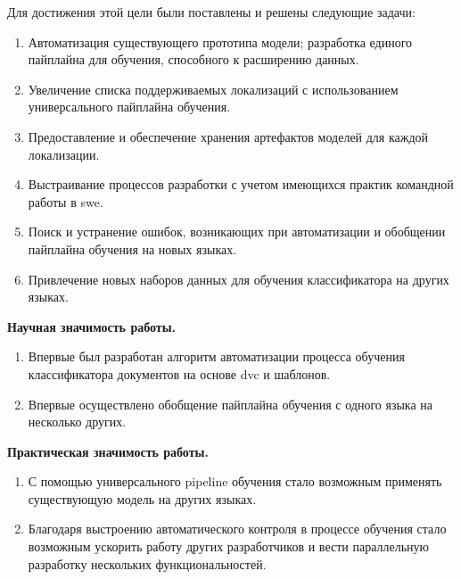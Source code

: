 Для достижения этой цели были поставлены и решены следующие задачи:
\begin{enumerate}
    \item Автоматизация существующего прототипа модели; разработка единого пайплайна для обучения, способного к расширению данных.
    \item Увеличение списка поддерживаемых локализаций с использованием универсального пайплайна обучения.
    \item Предоставление и обеспечение хранения артефактов моделей для каждой локализации.
    \item Выстраивание процессов разработки с учетом имеющихся практик командной работы в \gls{swe}.
    \item Поиск и устранение ошибок, возникающих при автоматизации и обобщении пайплайна обучения на новых языках.
    \item Привлечение новых наборов данных для обучения классификатора на других языках.
\end{enumerate}

\textbf{Научная значимость работы.}
\begin{enumerate}
    \item Впервые был разработан алгоритм автоматизации процесса обучения классификатора документов на основе \gls{dvc} и шаблонов.
    \item Впервые осуществлено обобщение пайплайна обучения с одного языка на несколько других.
\end{enumerate}

\textbf{Практическая значимость работы.}
\begin{enumerate}
    \item С помощью универсального \gls{pipeline} обучения стало возможным применять существующую модель на других языках.
    \item Благодаря выстроению автоматического контроля в процессе обучения стало возможным ускорить работу других разработчиков и вести параллельную разработку нескольких функциональностей.
\end{enumerate}
